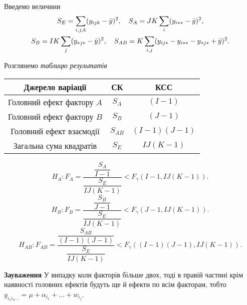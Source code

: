 Введемо величини 
\begin{multline*}
S_E = \displaystyle\sum\limits_{i,j,k}(y_{ijk}-\bar{y})^2, \quad S_A = JK\displaystyle\sum\limits_i(y_{i**}-\bar{y})^2, \\
S_B = IK\displaystyle\sum\limits_j(y_{*j*}-\bar{y})^2, \quad S_{AB} = K\displaystyle\sum\limits_{i,j}(y_{ij*} - y_{i**} - y_{*j*} + \bar{y})^2. 
\end{multline*}

Розглянемо \textit{таблицю результатів}
\begin{table}[H]
	\centering
	\begin{tabular}{|c|c|c|}
	\hline
	Джерело варіації & СК & КСС \\ \hline
	Головний ефект фактору $A$ & $S_A$ & $(I-1)$ \\ \hline
	Головний ефект фактору $B$ & $S_B$ & $(J-1)$ \\ \hline
	Головний ефект взаємодії & $S_{AB}$ & $(I-1)(J-1)$ \\ \hline
	Загальна сума квадратів & $S_E$ & $IJ(K-1)$ \\ \hline
	\end{tabular}
\end{table}

\[ H_A: F_A = \dfrac{\dfrac{S_A}{I-1}}{\dfrac{S_E}{IJ(K-1)}} < F_\gamma(I-1,IJ(K-1)). \]
\[ H_B: F_B = \dfrac{\dfrac{S_B}{J-1}}{\dfrac{S_E}{IJ(K-1)}} < F_\gamma(J-1,IJ(K-1)). \]
\[ H_{AB}: F_{AB} = \dfrac{\dfrac{S_{AB}}{(I-1)(J-1)}}{\dfrac{S_E}{IJ(K-1)}} < F_\gamma((I-1)(J-1),IJ(K-1)). \]

\textbf{Зауваження} У випадку коли факторів більше двох, тоді в правій частині крім наявності головних ефектів будуть ще й ефекти по всім факторам, тобто $y_{i_1i_2\ldots}=\mu+\alpha_{i_1}+\ldots+w_{i_f}$.
